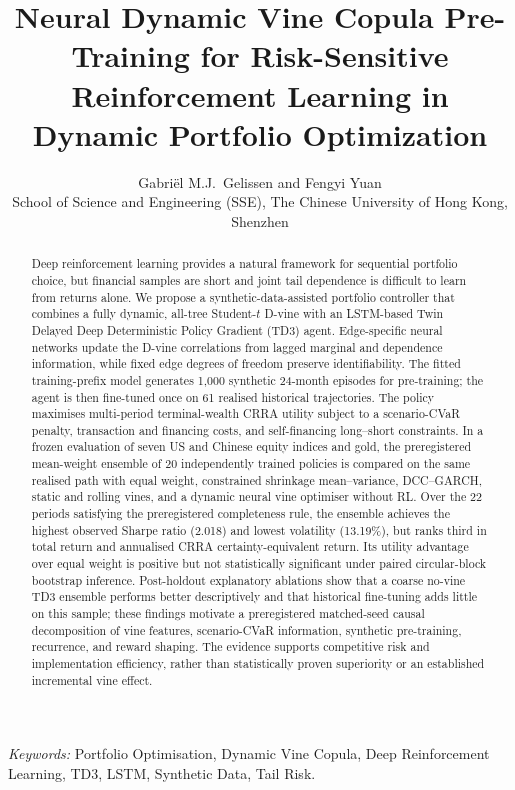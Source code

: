 \documentclass[11pt,a4paper]{article}
\title{Neural Dynamic Vine Copula Pre-Training for Risk-Sensitive Reinforcement Learning in Dynamic Portfolio Optimization}
\author{Gabriël M.J.\ Gelissen and Fengyi Yuan\\
\small School of Science and Engineering (SSE), The Chinese University of Hong Kong, Shenzhen}
\date{}
\begin{document}
\maketitle

\begin{abstract}
Deep reinforcement learning provides a natural framework for sequential portfolio choice, but financial samples are short and joint tail dependence is difficult to learn from returns alone. We propose a synthetic-data-assisted portfolio controller that combines a fully dynamic, all-tree Student-$t$ D-vine with an LSTM-based Twin Delayed Deep Deterministic Policy Gradient (TD3) agent. Edge-specific neural networks update the D-vine correlations from lagged marginal and dependence information, while fixed edge degrees of freedom preserve identifiability. The fitted training-prefix model generates 1,000 synthetic 24-month episodes for pre-training; the agent is then fine-tuned once on 61 realised historical trajectories. The policy maximises multi-period terminal-wealth CRRA utility subject to a scenario-CVaR penalty, transaction and financing costs, and self-financing long--short constraints. In a frozen evaluation of seven US and Chinese equity indices and gold, the preregistered mean-weight ensemble of 20 independently trained policies is compared on the same realised path with equal weight, constrained shrinkage mean--variance, DCC--GARCH, static and rolling vines, and a dynamic neural vine optimiser without RL. Over the 22 periods satisfying the preregistered completeness rule, the ensemble achieves the highest observed Sharpe ratio (2.018) and lowest volatility (13.19\%), but ranks third in total return and annualised CRRA certainty-equivalent return. Its utility advantage over equal weight is positive but not statistically significant under paired circular-block bootstrap inference. Post-holdout explanatory ablations show that a coarse no-vine TD3 ensemble performs better descriptively and that historical fine-tuning adds little on this sample; these findings motivate a preregistered matched-seed causal decomposition of vine features, scenario-CVaR information, synthetic pre-training, recurrence, and reward shaping. The evidence supports competitive risk and implementation efficiency, rather than statistically proven superiority or an established incremental vine effect.
\end{abstract}

\medskip
\noindent\textit{Keywords:} Portfolio Optimisation, Dynamic Vine Copula, Deep Reinforcement Learning, TD3, LSTM, Synthetic Data, Tail Risk.


%




 

 

\end{document}
